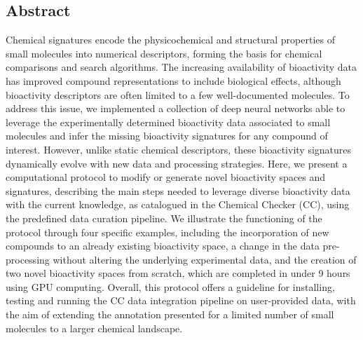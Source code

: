 \subsection{Abstract}

Chemical signatures encode the physicochemical and structural properties of small molecules into numerical descriptors, forming the basis for chemical comparisons and search algorithms. The increasing availability of bioactivity data has improved compound representations to include biological effects, although bioactivity descriptors are often limited to a few well-documented molecules. To address this issue, we implemented a collection of deep neural networks able to leverage the experimentally determined bioactivity data associated to small molecules and infer the missing bioactivity signatures for any compound of interest. However, unlike static chemical descriptors, these bioactivity signatures dynamically evolve with new data and processing strategies. Here, we present a computational protocol to modify or generate novel bioactivity spaces and signatures, describing the main steps needed to leverage diverse bioactivity data with the current knowledge, as catalogued in the Chemical Checker (CC), using the predefined data curation pipeline. We illustrate the functioning of the protocol through four specific examples, including the incorporation of new compounds to an already existing bioactivity space, a change in the data pre-processing without altering the underlying experimental data, and the creation of two novel bioactivity spaces from scratch, which are completed in under 9 hours using GPU computing. Overall, this protocol offers a guideline for installing, testing and running the CC data integration pipeline on user-provided data, with the aim of extending the annotation presented for a limited number of small molecules to a larger chemical landscape.